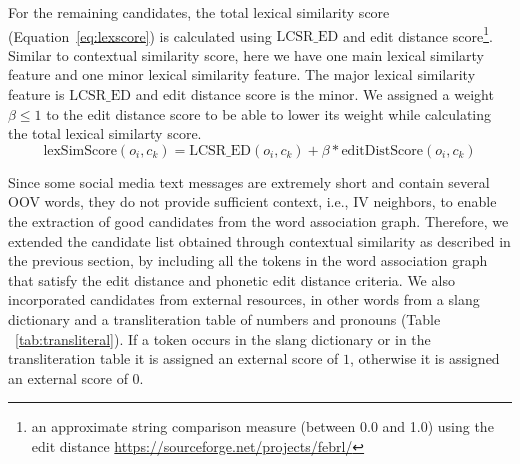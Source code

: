 \documentclass[a4paper,onesided,12pt]{report}
\begin{document}
For the remaining candidates, the total lexical similarity score (Equation~\ref{eq:lexscore}) is calculated using $\text{LCSR\_ED}$ and edit distance score\footnote{an approximate string comparison measure (between 0.0 and 1.0) using the edit distance \url{https://sourceforge.net/projects/febrl/}}. Similar to contextual similarity score, here we have one main lexical similarty feature and one minor lexical similarity feature. The major lexical similarity feature is $\text{LCSR\_ED}$ and edit distance score is the minor. We assigned a weight $\beta \leq 1$ to the edit distance score to be able to lower its weight while calculating the total lexical similarty score.
\begin{equation}
\text{lexSimScore}(o_i,c_k) = \text{LCSR\_ED}(o_i,c_k) + \beta * \text{editDistScore}(o_i,c_k)
\label{eq:lexscore}
\end{equation}
\par Since some social media text messages are extremely short and contain several OOV words, they do not provide sufficient context, i.e., IV neighbors, to enable the extraction of good candidates from the word association graph. Therefore, we extended the candidate list obtained through contextual similarity as described in the previous section, by including all the tokens in the word association graph that satisfy the edit distance and phonetic edit distance criteria. We also incorporated candidates from external resources, in other words from a slang dictionary and a transliteration table of numbers and pronouns (Table ~\ref{tab:transliteral}). If a token occurs in the slang dictionary or in the transliteration table it is assigned an external score of $1$, otherwise it is assigned an external score of $0$.
\end{document}
